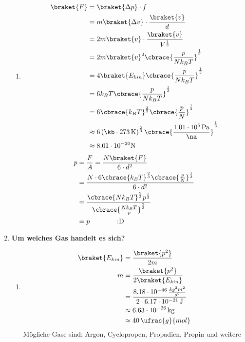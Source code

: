 \documentclass[11pt,letterpaper]{article}
\begin{document}
\begin{enumerate}
\begin{enumerate}
      \item 
        \begin{align*}
          \braket{F} &= \braket{\Delta p} \cdot f\\
          &= m\braket{\Delta v} \cdot \frac{\braket{v}}{d}\\
          &= 2m\braket{v} \cdot \frac{\braket{v}}{V^{\frac{1}{3}}}\\
          &= 2m \braket{v}^2\cbrace{\frac{p}{Nk_BT}}^{\frac{1}{3}}\\
          &= 4\braket{E_{kin}}\cbrace{\frac{p}{Nk_BT}}^{\frac{1}{3}}\\
          &= 6 k_B T \cbrace{\frac{p}{Nk_BT}}^{\frac{1}{3}}\\
          &= 6 \cbrace{k_B T}^{\frac{2}{3}} \cbrace{\frac{p}{N}}^{\frac{1}{3}}\\
          &\approx 6 \left(\kb \cdot 273\,\mathrm{K}\right)^{\frac{2}{3}}\cbrace{\frac{1.01\cdot 10^5\,\mathrm{Pa}}{\na}}^{\frac{1}{3}}\\
          &\approx 8.01 \cdot 10^{-20}\mathrm{N}\\
        \end{align*}
        \begin{align*}
          {p} &= \frac{F}{A} 
          = \frac{N \braket{F}}{6\cdot d^2}\\
          &= \frac{N \cdot 6 \cbrace{k_B T}^{\frac{2}{3}} \cbrace{\frac{p}{N}}^{\frac{1}{3}}}{6\cdot d^2}\\
          &= \frac{ \cbrace{N k_B T}^{\frac{2}{3}} {p}^{\frac{1}{3}}}{ \cbrace{\frac{Nk_BT}{p}}^{\frac{2}{3}}}\\
          &= p \qquad \qquad \text{:D}\\
        \end{align*}
    \end{enumerate}

\newpage
  \item \textbf{Um welches Gas handelt es sich? }
    \begin{enumerate}
      \item
        \begin{align*}
          \braket{E_{kin}} &= \frac{\braket{p^2}}{2m}\\
          m  &= \frac{\braket{p^2}}{2 \braket{E_{kin}}}\\
          &= \frac{8.18\cdot 10^{-46}\,\frac{kg^2m^2}{s^2}}{2 \cdot 6.17\cdot 10^{-21}\,\mathrm{J}}\\
          &\approx 6.63 \cdot 10^{-26}\,\mathrm{kg} \\
          &\approx 40\,\ufrac{g}{mol}
        \end{align*}
        Mögliche Gase sind: Argon, Cyclopropen, Propadien, Propin und weitere\\


\end{enumerate}
\end{enumerate}
\end{document}
